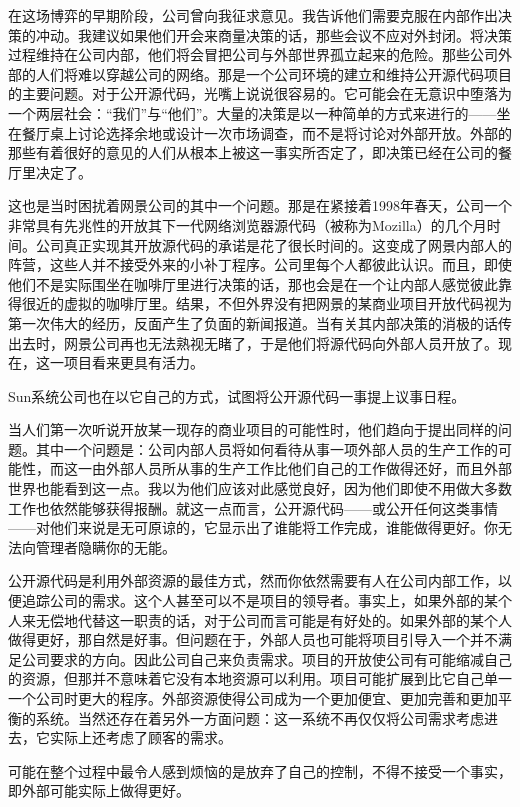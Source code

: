 在这场博弈的早期阶段，公司曾向我征求意见。我告诉他们需要克服在内部作出决策的冲动。我建议如果他们开会来商量决策的话，那些会议不应对外封闭。将决策过程维持在公司内部，他们将会冒把公司与外部世界孤立起来的危险。那些公司外部的人们将难以穿越公司的网络。那是一个公司环境的建立和维持公开源代码项目的主要问题。对于公开源代码，光嘴上说说很容易的。它可能会在无意识中堕落为一个两层社会：“我们”与“他们”。大量的决策是以一种简单的方式来进行的——坐在餐厅桌上讨论选择余地或设计一次市场调查，而不是将讨论对外部开放。外部的那些有着很好的意见的人们从根本上被这一事实所否定了，即决策已经在公司的餐厅里决定了。

这也是当时困扰着网景公司的其中一个问题。那是在紧接着1998年春天，公司一个非常具有先兆性的开放其下一代网络浏览器源代码（被称为Mozilla）的几个月时间。公司真正实现其开放源代码的承诺是花了很长时间的。这变成了网景内部人的阵营，这些人并不接受外来的小补丁程序。公司里每个人都彼此认识。而且，即使他们不是实际围坐在咖啡厅里进行决策的话，那也会是在一个让内部人感觉彼此靠得很近的虚拟的咖啡厅里。结果，不但外界没有把网景的某商业项目开放代码视为第一次伟大的经历，反面产生了负面的新闻报道。当有关其内部决策的消极的话传出去时，网景公司再也无法熟视无睹了，于是他们将源代码向外部人员开放了。现在，这一项目看来更具有活力。

Sun系统公司也在以它自己的方式，试图将公开源代码一事提上议事日程。

当人们第一次听说开放某一现存的商业项目的可能性时，他们趋向于提出同样的问题。其中一个问题是：公司内部人员将如何看待从事一项外部人员的生产工作的可能性，而这一由外部人员所从事的生产工作比他们自己的工作做得还好，而且外部世界也能看到这一点。我以为他们应该对此感觉良好，因为他们即使不用做大多数工作也依然能够获得报酬。就这一点而言，公开源代码——或公开任何这类事情——对他们来说是无可原谅的，它显示出了谁能将工作完成，谁能做得更好。你无法向管理者隐瞒你的无能。

公开源代码是利用外部资源的最佳方式，然而你依然需要有人在公司内部工作，以便追踪公司的需求。这个人甚至可以不是项目的领导者。事实上，如果外部的某个人来无偿地代替这一职责的话，对于公司而言可能是有好处的。如果外部的某个人做得更好，那自然是好事。但问题在于，外部人员也可能将项目引导入一个并不满足公司要求的方向。因此公司自己来负责需求。项目的开放使公司有可能缩减自己的资源，但那并不意味着它没有本地资源可以利用。项目可能扩展到比它自己单一一个公司时更大的程序。外部资源使得公司成为一个更加便宜、更加完善和更加平衡的系统。当然还存在着另外一方面问题：这一系统不再仅仅将公司需求考虑进去，它实际上还考虑了顾客的需求。

可能在整个过程中最令人感到烦恼的是放弃了自己的控制，不得不接受一个事实，即外部可能实际上做得更好。

